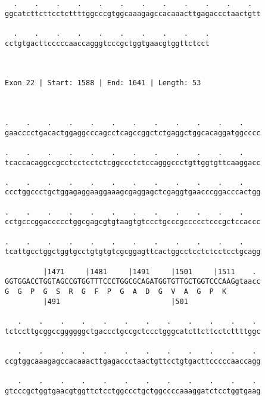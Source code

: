 \documentclass{article}
\begin{document}
\begin{Verbatim}
  .    .    .    .    .    .    .    .    .    .    .    .  
ggcatcttcttcctcttttggcccgtggcaaagagccacaaacttgagaccctaactgtt
                                                            
  .    .    .    .    .    .    .    .    .    .
cctgtgacttcccccaaccagggtcccgctggtgaacgtggttctcct
                                                
                                                
 
Exon 22 | Start: 1588 | End: 1641 | Length: 53



.    .    .    .    .    .    .    .    .    .    .    .    
gaacccctgacactggaggcccagcctcagccggctctgaggctggcacaggatggcccc
                                                            
.    .    .    .    .    .    .    .    .    .    .    .    
tcaccacaggccgcctcctcctctcggccctctccagggccctgttggtgttcaaggacc
                                                            
.    .    .    .    .    .    .    .    .    .    .    .    
ccctggccctgctggagaggaaggaaagcgaggagctcgaggtgaacccggacccactgg
                                                            
.    .    .    .    .    .    .    .    .    .    .    .    
cctgcccggaccccctggcgagcgtgtaagtgtccctgcccgccccctcccgctccaccc
                                                            
.    .    .    .    .    .    .    .    .    .    .    .    
tcattgcctggctggtgcctgtgtgtcgcggagttcactggcctcctctcctcctgcagg
                                                            
         |1471     |1481     |1491     |1501     |1511    . 
GGTGGACCTGGTAGCCGTGGTTTCCCTGGCGCAGATGGTGTTGCTGGTCCCAAGgtaacc
G  G  P  G  S  R  G  F  P  G  A  D  G  V  A  G  P  K        
         |491                          |501                 
  
   .    .    .    .    .    .    .    .    .    .    .    . 
tctccttgcggccggggggctgaccctgccgctccctgggcatcttcttcctcttttggc
                                                            
   .    .    .    .    .    .    .    .    .    .    .    . 
ccgtggcaaagagccacaaacttgagaccctaactgttcctgtgacttcccccaaccagg
                                                            
   .    .    .    .    .    .    .    .    .    .    .    . 
gtcccgctggtgaacgtggttctcctggccctgctggccccaaaggatctcctggtgaag
                                                            

\end{Verbatim}
\end{document}
